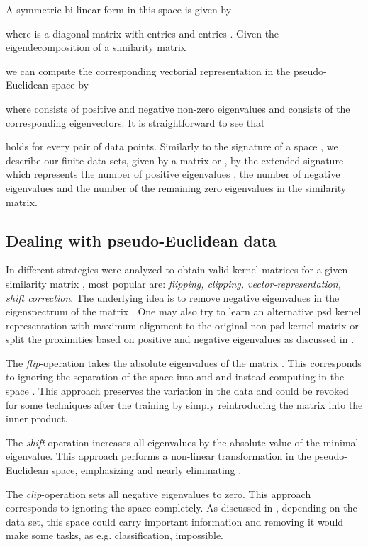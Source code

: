 \documentclass[twoside,11pt]{article}
\begin{document}
A symmetric bi-linear form in this space is given by 

where  is a diagonal matrix with  entries  and  entries .
Given the eigendecomposition of a similarity matrix

we can compute the corresponding vectorial representation 
in the pseudo-Euclidean space by

where  consists of  positive and  negative
non-zero eigenvalues and  consists of the corresponding eigenvectors.
It is straightforward to see that

holds for every pair of data points.
Similarly to the signature  of a space ,
we describe our finite data sets, given by a matrix  or ,
by the extended signature 
which represents the number of positive eigenvalues ,
the number of negative eigenvalues 
and the number of the remaining zero eigenvalues
in the similarity matrix.

\subsection{Dealing with pseudo-Euclidean data}
\label{sec:trafos_corr}
In \cite{DBLP:journals/jmlr/ChenGGRC09} different strategies were analyzed to
obtain valid kernel matrices for a given similarity matrix ,
most popular are: \emph{flipping, clipping, vector-representation, shift correction}.
The underlying idea is to remove negative eigenvalues
in the eigenspectrum of the matrix .
One may also try to learn an alternative psd kernel representation with maximum alignment to the original non-psd kernel matrix \cite{DBLP:journals/jmlr/ChenGGRC09,DBLP:conf/icml/ChenGR09,DBLP:journals/jmlr/LiZY09}
or split the proximities based on positive and negative eigenvalues as discussed in
\cite{Pekalska2005a,Haasdonk2009a}.

The \emph{flip}-operation takes the absolute eigenvalues of the matrix .
This corresponds to ignoring the separation of the space 
into  and  and instead computing in the space .
This approach preserves the variation in the data
and could be revoked for some techniques after the training
by simply reintroducing the matrix  into the inner product.

The \emph{shift}-operation increases all eigenvalues by the absolute
value of the minimal eigenvalue.
This approach performs a non-linear transformation in the pseudo-Euclidean space,
emphasizing  and nearly eliminating .

The \emph{clip}-operation sets all negative eigenvalues to zero.
This approach corresponds to ignoring the space  completely.
As discussed in \cite{DBLP:conf/sspr/PekalskaDGB04}, depending on the data set,
this space could carry important information
and removing it would make some tasks, as e.g. classification, impossible.
\end{document}
